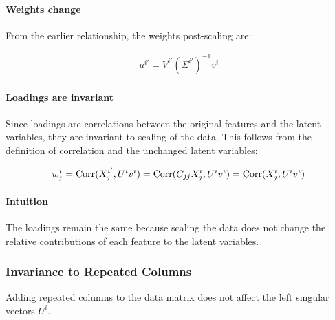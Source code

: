 \paragraph{Weights change}

From the earlier relationship, the weights post-scaling are:

\begin{align}
    u^{i'} = V^{i'}(\Sigma^{i'})^{-1}v^{i} \label{eq:weights_change}
\end{align}

\paragraph{Loadings are invariant}

Since loadings are correlations between the original features and the latent variables, they are invariant to scaling of the data. 
This follows from the definition of correlation and the unchanged latent variables:

\begin{align}
    w^{i}_j = \operatorname{Corr}(X^{i'}_j, U^{i}v^{i}) = \operatorname{Corr}(C_{jj}X^{i}_j, U^{i}v^{i}) = \operatorname{Corr}(X^{i}_j, U^{i}v^{i}) \label{eq:loading_invariant}
\end{align}

\paragraph{Intuition}
The loadings remain the same because scaling the data does not change the relative contributions of each feature to the latent variables.

\subsubsection{Invariance to Repeated Columns}\label{subsubsec:invariance-to-repeated-columns}

\begin{lemma}
Adding repeated columns to the data matrix does not affect the left singular vectors $U^{i}$.
\end{lemma}


